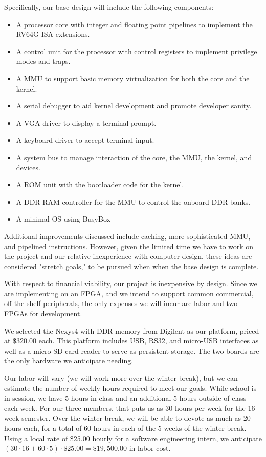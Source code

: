 \documentclass{article}
\begin{document}
Specifically, our base design will include the following components:
\begin{itemize}
    \item A processor core with integer and floating point pipelines to implement the RV64G ISA extensions.
    \item A control unit for the processor with control registers to implement privilege modes and traps.
    \item A MMU to support basic memory virtualization for both the core and the kernel.
    \item A serial debugger to aid kernel development and promote developer sanity.
    \item A VGA driver to display a terminal prompt.
    \item A keyboard driver to accept terminal input.
    \item A system bus to manage interaction of the core, the MMU, the kernel, and devices.
    \item A ROM unit with the bootloader code for the kernel.
    \item A DDR RAM controller for the MMU to control the onboard DDR banks.
    \item A minimal OS using BusyBox
\end{itemize}

Additional improvements discussed include caching, more sophisticated MMU, and pipelined instructions.  However, given the limited time we have to work on the project and our relative inexperience with computer design, these ideas are considered "stretch goals," to be pursued when when the base design is complete.

With respect to financial viability, our project is inexpensive by design.  Since we are implementing on an FPGA, and we intend to support common commercial, off-the-shelf peripherals, the only expenses we will incur are labor and two FPGAs for development.  

We selected the Nexys4 with DDR memory from Digilent as our platform, priced at \$320.00 each.  This platform includes USB, RS32, and micro-USB interfaces as well as a micro-SD card reader to serve as persistent storage.  The two boards are the only hardware we anticipate needing.

Our labor will vary (we will work more over the winter break), but we can estimate the number of weekly hours required to meet our goals.  While school is in session, we have 5 hours in class and an additional 5 hours outside of class each week.  For our three members, that puts us as 30 hours per week for the 16 week semester.  Over the winter break, we will be able to devote as much as 20 hours each, for a total of 60 hours in each of the 5 weeks of the winter break.  Using a local rate of \$25.00 hourly for a software engineering intern, we anticipate $(30\cdot 16 + 60\cdot 5)\cdot \$25.00 = \$19,500.00$ in labor cost.
\end{document}
